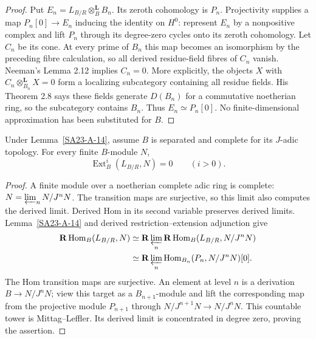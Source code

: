 \begin{proof}
Put $E_n=L_{B/R}\otimes_B^{\mathbf L}B_n$. Its zeroth cohomology
is $P_n$. Projectivity supplies a map $P_n[0]\to E_n$ inducing the
identity on $H^0$: represent $E_n$ by a nonpositive complex and lift
$P_n$ through its degree-zero cycles onto its zeroth cohomology.
Let $C_n$ be its cone. At every prime of $B_n$ this map becomes an
isomorphism by the preceding fibre calculation, so all derived
residue-field fibres of $C_n$ vanish. Neeman's Lemma 2.12
\cite[p.~527]{rootNeeman1992} implies $C_n=0$. More explicitly, the objects
$X$ with $C_n\otimes^{\mathbf L}_{B_n}X=0$ form a localizing
subcategory containing all residue fields. His Theorem 2.8 says these
fields generate $D(B_n)$ for a commutative noetherian ring, so the
subcategory contains $B_n$. Thus $E_n\simeq P_n[0]$. No
finite-dimensional approximation has been substituted for $B$.
\end{proof}

\begin{lemma}
\label{SA23-A-15}
Under Lemma~\ref{SA23-A-14}, assume $B$ is separated and complete
for its $J$-adic topology. For every finite $B$-module $N$,
\[
 \operatorname{Ext}^i_B(L_{B/R},N)=0\qquad(i>0).
\]
\end{lemma}
\begin{proof}
A finite module over a noetherian complete adic ring is complete:
$N=\varprojlim_nN/J^nN$. The transition maps are surjective, so this
limit also computes the derived limit. Derived Hom in its second
variable preserves derived limits. Lemma~\ref{SA23-A-14} and
derived restriction--extension adjunction give
\[
\begin{split}
 \mathbf R\operatorname{Hom}_B(L_{B/R},N)
 &\simeq \mathbf R\varprojlim_n
       \mathbf R\operatorname{Hom}_B(L_{B/R},N/J^nN)\\
 &\simeq \mathbf R\varprojlim_n
       \operatorname{Hom}_{B_n}(P_n,N/J^nN)[0].
\end{split}
\]
The Hom transition maps are surjective. An element at level $n$
is a derivation $B\to N/J^nN$; view this target as a
$B_{n+1}$-module and lift the corresponding map from the projective
module $P_{n+1}$ through $N/J^{n+1}N\to N/J^nN$.
This countable tower is Mittag--Leffler. Its derived limit is
concentrated in degree zero, proving the assertion.
\end{proof}

